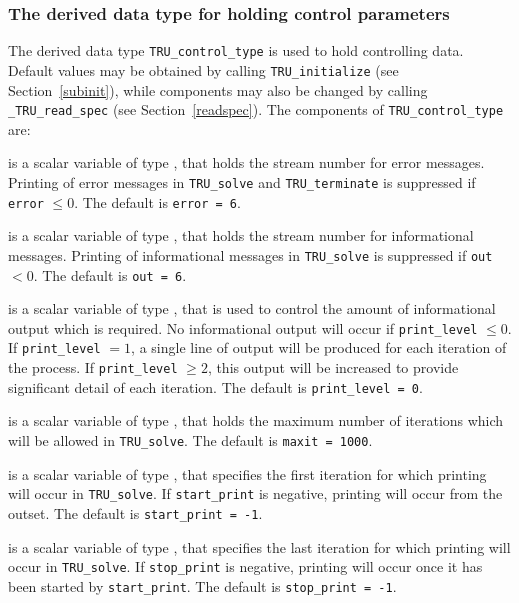 \documentclass{galahad}
\newcommand{\packagename}{TRU}
\newcommand{\fullpackagename}{\libraryname\_\packagename}
\begin{document}
\subsubsection{The derived data type for holding control
 parameters}\label{typecontrol}
The derived data type
{\tt \packagename\_control\_type}
is used to hold controlling data. Default values may be obtained by calling
{\tt \packagename\_initialize}
(see Section~\ref{subinit}),
while components may also be changed by calling
{\tt \fullpackagename\_read\-\_spec}
(see Section~\ref{readspec}).
The components of
{\tt \packagename\_control\_type}
are:


\begin{description}

 is a scalar variable of type \integer, that holds the
stream number for error messages. Printing of error messages in
{\tt \packagename\_solve} and {\tt \packagename\_terminate}
is suppressed if {\tt error} $\leq 0$.
The default is {\tt error = 6}.

 is a scalar variable of type \integer, that holds the
stream number for informational messages. Printing of informational messages in
{\tt \packagename\_solve} is suppressed if {\tt out} $< 0$.
The default is {\tt out = 6}.

 is a scalar variable of type \integer, that is used
to control the amount of informational output which is required. No
informational output will occur if {\tt print\_level} $\leq 0$. If
{\tt print\_level} $= 1$, a single line of output will be produced for each
iteration of the process. If {\tt print\_level} $\geq 2$, this output will be
increased to provide significant detail of each iteration.
The default is {\tt print\_level = 0}.

 is a scalar variable of type \integer, that holds the
maximum number of iterations which will be allowed in {\tt \packagename\_solve}.
The default is {\tt maxit = 1000}.

 is a scalar variable of type \integer, that specifies
the first iteration for which printing will occur in {\tt \packagename\_solve}.
If {\tt start\_print} is negative, printing will occur from the outset.
The default is {\tt start\_print = -1}.

 is a scalar variable of type \integer, that specifies
the last iteration for which printing will occur in  {\tt \packagename\_solve}.
If {\tt stop\_print} is negative, printing will occur once it has been
started by {\tt start\_print}.
The default is {\tt stop\_print = -1}.


\end{description}
\end{document}
